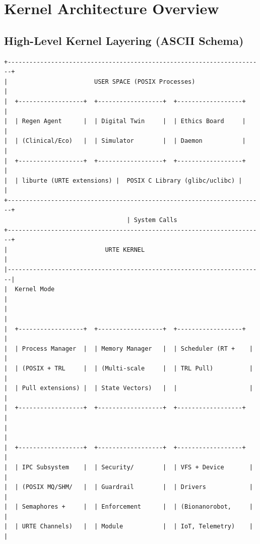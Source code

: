 \documentclass[11pt,a4paper]{report}
\begin{document}
\chapter{Kernel Architecture Overview}

\section{High-Level Kernel Layering (ASCII Schema)}

\begin{lstlisting}[style=kernelschema, caption={URTE Kernel High-Level Architecture}]
+-----------------------------------------------------------------------+
|                        USER SPACE (POSIX Processes)                   |
|  +------------------+  +------------------+  +------------------+     |
|  | Regen Agent      |  | Digital Twin     |  | Ethics Board     |     |
|  | (Clinical/Eco)   |  | Simulator        |  | Daemon           |     |
|  +------------------+  +------------------+  +------------------+     |
|  | liburte (URTE extensions) |  POSIX C Library (glibc/uclibc) |     |
+-----------------------------------------------------------------------+
                                  | System Calls
+-----------------------------------------------------------------------+
|                           URTE KERNEL                                 |
|-----------------------------------------------------------------------|
|  Kernel Mode                                                          |
|                                                                       |
|  +------------------+  +------------------+  +------------------+     |
|  | Process Manager  |  | Memory Manager   |  | Scheduler (RT +    |     |
|  | (POSIX + TRL     |  | (Multi-scale     |  | TRL Pull)          |     |
|  | Pull extensions) |  | State Vectors)   |  |                    |     |
|  +------------------+  +------------------+  +------------------+     |
|                                                                       |
|  +------------------+  +------------------+  +------------------+     |
|  | IPC Subsystem    |  | Security/        |  | VFS + Device       |     |
|  | (POSIX MQ/SHM/   |  | Guardrail        |  | Drivers            |     |
|  | Semaphores +     |  | Enforcement      |  | (Bionanorobot,     |     |
|  | URTE Channels)   |  | Module           |  | IoT, Telemetry)    |     |

\end{lstlisting}
\end{document}
